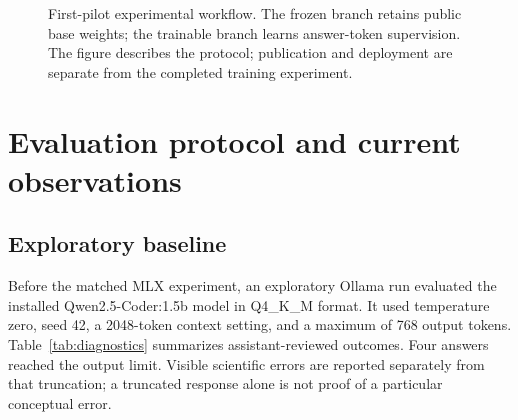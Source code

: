 \documentclass[11pt]{article}
\begin{document}
\begin{figure}[ht]
\centering
{}
\caption{First-pilot experimental workflow. The frozen branch retains public base
weights; the trainable branch learns answer-token supervision. The figure
describes the protocol; publication and deployment are separate from the
completed training experiment.}
\end{figure}

\section{Evaluation protocol and current observations}
\subsection{Exploratory baseline}
Before the matched MLX experiment, an exploratory Ollama run evaluated the
installed Qwen2.5-Coder:1.5b model in Q4\_K\_M format. It used temperature zero,
seed 42, a 2048-token context setting, and a maximum of 768 output tokens.
Table~\ref{tab:diagnostics} summarizes assistant-reviewed outcomes. Four
answers reached the output limit. Visible scientific errors are reported
separately from that truncation; a truncated response alone is not proof of
a particular conceptual error.
\end{document}
